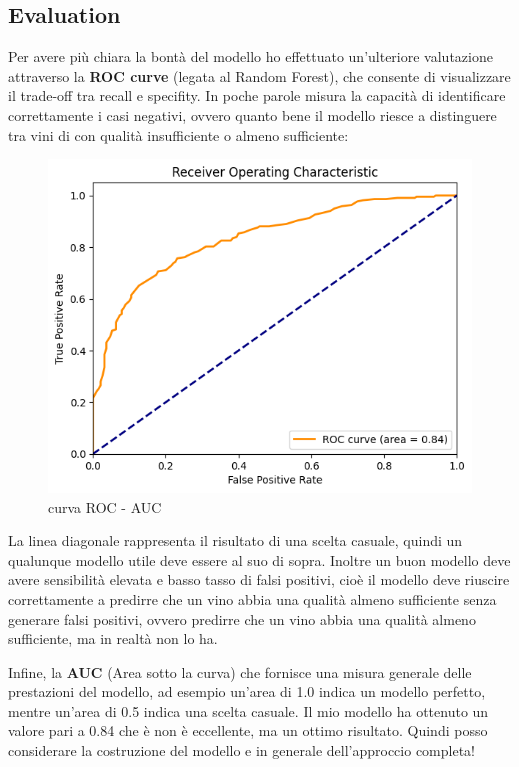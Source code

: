 \documentclass{article}
\begin{document}
\begin{titlepage}
        \section{Evaluation}
        Per avere più chiara la bontà del modello ho effettuato un’ulteriore valutazione attraverso la \textbf{ROC
        curve} (legata al Random Forest), che consente di visualizzare il trade-off tra recall e specifity. In poche parole misura la
        capacità di identificare correttamente i casi negativi, ovvero quanto bene il modello riesce a distinguere
        tra vini di con qualità insufficiente o almeno sufficiente:
        \begin{figure}[ht]
            \centering
            \includegraphics[width=0.6\linewidth]{roc-auc-curve.png}
            \caption{  curva ROC - AUC}
            \label{fig:enter-label}
        \end{figure}

        La linea diagonale rappresenta il risultato di una scelta casuale, quindi un
        qualunque modello utile deve essere al suo di sopra. Inoltre un buon modello
        deve avere sensibilità elevata e basso
        tasso di falsi positivi, cioè il modello deve riuscire correttamente a predirre che
        un vino abbia una qualità almeno sufficiente senza generare falsi positivi,
        ovvero predirre
        che un vino abbia una qualità almeno sufficiente, ma in realtà non lo ha.
        
        Infine, la \textbf{AUC} (Area sotto la curva) che fornisce una misura generale delle
        prestazioni del modello, ad esempio un’area di 1.0 indica un modello perfetto,
        mentre un’area di 0.5 indica una scelta casuale. Il mio modello ha ottenuto
        un valore pari a 0.84 che è non è eccellente, ma un ottimo risultato. Quindi posso considerare la
        costruzione del modello e in generale dell’approccio completa!


\end{titlepage}
\end{document}

